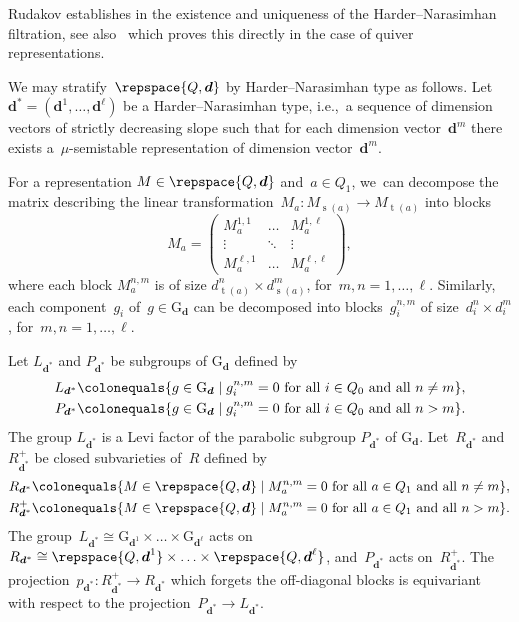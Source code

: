 \documentclass[JEP,XML,SOM,Unicode,NoEqCountersInSection,published]{cedram}
\theoremstyle{plain}
\theoremstyle{definition}
\DeclareMathOperator\source{s}
\DeclareMathOperator\target{t}
\newcommand\group[1][\tuple{d}]{\mathrm{G}_{#1}}
\newcommand\tuple[1]{\ensuremath{{\boldsymbol{#1}}}}
\begin{document}
Rudakov establishes in \cite[Th.\,3]{MR1480783} the existence
and uniqueness
of the Harder--Nara\-sim\-han filtration,
see also~\cite[Th.\,2.5]{MR1906875} which proves this directly
in the case of quiver representations.

We may stratify~$\repspace{Q,\tuple{d}}$ by Harder--Narasimhan type as follows.
Let~$\tuple{d}^* = (\tuple{d}^1,\ldots,\tuple{d}^\ell)$ be a Harder--Narasimhan type,
i.e.,~a sequence of dimension vectors of strictly decreasing slope
such that for each dimension vector~$\tuple{d}^m$
there exists a~$\mu$\nobreakdash-semistable representation of dimension vector~$\tuple{d}^m$.

For a representation $M \in \repspace{Q,\tuple{d}}$
and~$a\in Q_1$, we~can decompose the matrix
describing the linear transformation~$M_a\colon M_{\source(a)}\to M_{\target(a)}$ into blocks
\begin{equation}
\label{equation:shape-matrix-HN-blocks}
M_a =
\left(
\begin{matrix}
M_a^{1,1} & \hdots & M_a^{1,\ell} \\
\vdots & \ddots & \vdots \\
M_a^{\ell,1} & \hdots & M_a^{\ell,\ell}
\end{matrix}
\right),
\end{equation}
where each block $M_a^{n,m}$ is of size $d^n_{\target(a)} \times d^m_{\source(a)}$,
for~$m,n=1,\ldots,\ell$.
Similarly, each component~$g_i$ of~$g \in \group$
can be decomposed into blocks~$g_i^{n,m}$ of size~$d^n_i \times d^m_i$,
for~$m,n=1,\ldots,\ell$.

Let $L_{\tuple{d}^*}$ and $P_{\tuple{d}^*}$ be subgroups of ${\group}$ defined by
\begin{align*}
L_{\tuple{d}^*} &\colonequals \{ g \in \group \mid g_i^{n,m} = 0 \text{ for all $i \in Q_0$ and all $n \neq m$}\}, \\
P_{\tuple{d}^*} &\colonequals \{ g \in \group \mid g_i^{n,m} = 0 \text{ for all $i \in Q_0$ and all $n > m$}\}.
\end{align*}
The group $L_{\tuple{d}^*}$ is a Levi factor of the parabolic subgroup $P_{\tuple{d}^*}$ of $\group$.
Let~$R_{\tuple{d}^*}$ and~$R_{\tuple{d}^*}^+$ be closed subvarieties of~$R$ defined by
\begin{equation}\label{equation:upper-triangular}
\begin{aligned}
R_{\tuple{d}^*} &\colonequals \{ M \in \repspace{Q,\tuple{d}} \mid M_a^{n,m} = 0 \text{ for all $a \in Q_1$ and all $n \neq m$}\}, \\
R_{\tuple{d}^*}^+ &\colonequals \{ M \in \repspace{Q,\tuple{d}} \mid M_a^{n,m} = 0 \text{ for all $a \in Q_1$ and all $n > m$}\}.
\end{aligned}
\end{equation}
The group~$L_{\tuple{d}^*} \cong \group[\tuple{d}^1] \times \ldots \times \group[\tuple{d}^\ell]$
acts on~$R_{\tuple{d}^*} \cong \repspace{Q,\tuple{d}^1} \times \ldots \times \repspace{Q,\tuple{d}^\ell}$,
and~$P_{\tuple{d}^*}$ acts on~$R_{\tuple{d}^*}^+$.
The projection~$p_{\tuple{d}^*}\colon R_{\tuple{d}^*}^+ \to R_{\tuple{d}^*}$
which forgets the off-diagonal blocks is equivariant with respect to the projection~$P_{\tuple{d}^*} \to L_{\tuple{d}^*}$.
\end{document}
